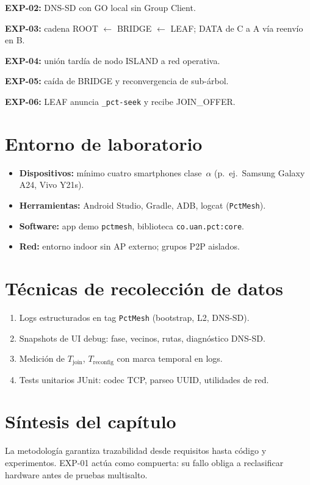\textbf{EXP-02:} DNS-SD con GO local sin Group Client.

\textbf{EXP-03:} cadena ROOT $\leftarrow$ BRIDGE $\leftarrow$ LEAF; DATA de C a A vía reenvío en B.

\textbf{EXP-04:} unión tardía de nodo ISLAND a red operativa.

\textbf{EXP-05:} caída de BRIDGE y reconvergencia de sub-árbol.

\textbf{EXP-06:} LEAF anuncia \texttt{\_pct-seek} y recibe JOIN\_OFFER.

\section{Entorno de laboratorio}
\label{sec:entorno-lab}

\begin{itemize}
  \item \textbf{Dispositivos:} mínimo cuatro smartphones clase~$\alpha$ (p.\ ej.\ Samsung Galaxy A24, Vivo Y21s).
  \item \textbf{Herramientas:} Android Studio, Gradle, ADB, logcat (\texttt{PctMesh}).
  \item \textbf{Software:} app demo \texttt{pctmesh}, biblioteca \texttt{co.uan.pct:core}.
  \item \textbf{Red:} entorno indoor sin AP externo; grupos P2P aislados.
\end{itemize}

\section{Técnicas de recolección de datos}
\label{sec:recoleccion-datos}

\begin{enumerate}
  \item Logs estructurados en tag \texttt{PctMesh} (bootstrap, L2, DNS-SD).
  \item Snapshots de UI debug: fase, vecinos, rutas, diagnóstico DNS-SD.
  \item Medición de $T_{\mathrm{join}}$, $T_{\mathrm{reconfig}}$ con marca temporal en logs.
  \item Tests unitarios JUnit: codec TCP, parseo UUID, utilidades de red.
\end{enumerate}

\section{Síntesis del capítulo}
\label{sec:sintesis-metodologia}

La metodología garantiza trazabilidad desde requisitos hasta código y experimentos. EXP-01 actúa como compuerta: su fallo obliga a reclasificar hardware antes de pruebas multisalto.
